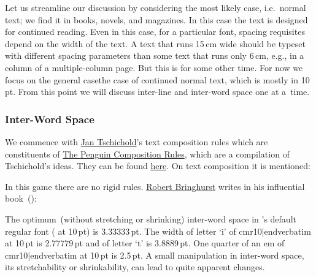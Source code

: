 {Let us streamline our discussion by considering the most likely case, i.e.\ normal text; we find it in books, novels, and magazines. In this case the text is designed for continued reading. Even in this case, for a particular font, spacing requisites depend on the width of the text. A text that runs 15\,cm wide should be typeset with different spacing parameters than some text that runs only 6\,cm, e.g., in a column of a multiple-column page. But this is for some other time. For now we focus on the general case\emdash the case of continued normal text, which is mostly in 10\,pt. From this point we will discuss inter-line and inter-word space one at a~time.

\subsubsection{Inter-Word Space}
We commence with \href{http://www.linotype.com/794/inhonorofthe100thbirthdayofjantschichold.html}{Jan Tschichold}'s text composition rules which are constituents of \href{http://openlibrary.org/books/OL19449256M/Penguin_composition_rules.}{The Penguin Composition Rules}, which are a compilation of Tschichold's ideas. They can be found \href{http://ronin-group.org/misc_etext_tschichold.html}{here}. On text composition it is mentioned:

\ii In this game there are no rigid rules. \href{http://www.typotheque.com/authors/robert_bringhurst}{Robert Bringhurst} writes in his influential book~(\cite{elements_typographic}):

\ii The optimum~(without stretching or shrinking) inter-word space in \capstex's default regular font ( at 10\,pt) is 3.33333\,pt. The width of letter `i' of {\verbatim cmr10|endverbatim} at 10\,pt is 2.77779\,pt and of letter `t' is 3.8889\,pt. One quarter of an em of {\verbatim cmr10|endverbatim} at 10\,pt is 2.5\,pt. A small manipulation in inter-word space, its stretchability or shrinkability, can lead to quite apparent changes.

}
